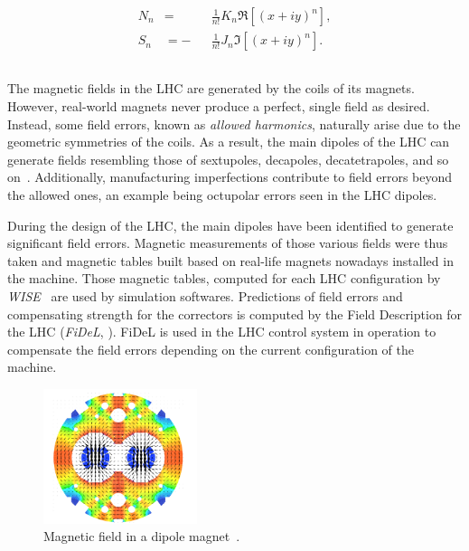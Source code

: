 \begin{equation}
    \begin{aligned}
        N_n &=  &&\frac{1}{n!} K_n \Re \left[ (x+iy)^n \right], \\
        S_n &= -&&\frac{1}{n!} J_n \Im \left[ (x+iy)^n \right].
    \end{aligned}
    \label{eq:normal_skew_hamiltonian_magnet}
\end{equation}



\subsection{}
The magnetic fields in the LHC are generated by the coils of its magnets. However, real-world
magnets never produce a perfect, single field as desired. Instead, some field errors, known as
\textit{allowed harmonics}, naturally arise due to the geometric symmetries of the coils. As a
result, the main dipoles of the LHC can generate fields resembling those of sextupoles, decapoles,
decatetrapoles, and so on~\cite{deniau_magnetic_2009}. Additionally, manufacturing imperfections
contribute to field errors beyond the allowed ones, an example being octupolar errors seen in
the LHC dipoles.

During the design of the LHC, the main dipoles have been identified to generate significant field
errors. Magnetic measurements of those various fields were thus taken and magnetic tables built
based on real-life magnets nowadays installed in the machine. Those magnetic tables, computed for
each LHC configuration by \textit{WISE}~\cite{p_hagen_wise_2006} are used by simulation softwares.
Predictions of field errors and compensating strength for the correctors is computed by the Field
Description for the LHC (\textit{FiDeL}, \cite{noauthor_fidel_2021}). FiDeL is used in the LHC
control system in operation to compensate the field errors depending on the current configuration of
the machine.

\begin{figure}[!htb]
    \centering
    \includegraphics[width=0.4\textwidth]{./images/main_dipole_fields.png}
    \caption{Magnetic field in a dipole magnet~\cite{deniau_magnetic_2009}.}
    \label{fig:decapoles:magnetic_field_dipole}
\end{figure}

\FloatBarrier
